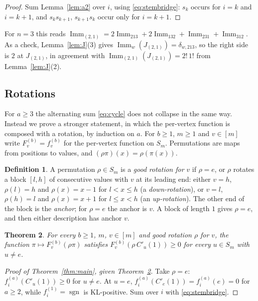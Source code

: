 \documentclass[11pt]{amsart}
\newtheorem{theorem}{Theorem}[section]
\theoremstyle{definition}
\newtheorem{definition}[theorem]{Definition}
\theoremstyle{remark}
\newcommand{\Imm}{\operatorname{Imm}}
\newcommand{\sgn}{\operatorname{sgn}}
\newcommand{\Cp}[1]{C'_{#1}(1)}
\begin{document}
\begin{proof}
Sum Lemma~\ref{lem:a2} over $i$, using \eqref{eq:stembridge}: $s_k$ occurs for $i=k$ and $i=k+1$, and $s_ks_{k+1}$, $s_{k+1}s_k$ occur only for $i=k+1$.
\end{proof}

For $n=3$ this reads $\Imm_{(2,1)}=2\Imm_{213}+2\Imm_{132}+\Imm_{231}+\Imm_{312}$. As a check, Lemma~\ref{lem:J}(3) gives $\Imm_w(J_{(2,1)})=\delta_{w,213}$, so the right side is $2$ at $J_{(2,1)}$, in agreement with $\Imm_{(2,1)}(J_{(2,1)})=2!\,1!$ from Lemma~\ref{lem:J}(2).

\subsection{Rotations}
For $a\ge3$ the alternating sum \eqref{eq:cycle} does not collapse in the same way. Instead we prove a stronger statement, in which the per-vertex function is composed with a rotation, by induction on $a$. For $b\ge1$, $m\ge1$ and $v\in[m]$ write $F^{(b)}_v=f^{(b)}_v$ for the per-vertex function on $S_m$. Permutations are maps from positions to values, and $(\rho\pi)(x)=\rho(\pi(x))$.

\begin{definition}\label{def:good}
A permutation $\rho\in S_m$ is a \emph{good rotation for $v$} if $\rho=e$, or $\rho$ rotates a block $[l,h]$ of consecutive values with $v$ at its leading end: either $v=h$, $\rho(l)=h$ and $\rho(x)=x-1$ for $l<x\le h$ (a \emph{down-rotation}), or $v=l$, $\rho(h)=l$ and $\rho(x)=x+1$ for $l\le x<h$ (an \emph{up-rotation}). The other end of the block is the \emph{anchor}; for $\rho=e$ the anchor is $v$. A block of length $1$ gives $\rho=e$, and then either description has anchor $v$.
\end{definition}

\begin{theorem}\label{thm:rotated}
For every $b\ge1$, $m$, $v\in[m]$ and good rotation $\rho$ for $v$, the function $\pi\mapsto F^{(b)}_v(\rho\pi)$ satisfies $F^{(b)}_v(\rho\,\Cp u)\ge0$ for every $u\in S_m$ with $u\ne e$.
\end{theorem}

\begin{proof}[Proof of Theorem~\ref{thm:main}, given Theorem~\ref{thm:rotated}]
Take $\rho=e$: $f^{(a)}_i(\Cp u)\ge0$ for $u\ne e$. At $u=e$, $f^{(a)}_i(\Cp e)=f^{(a)}_i(e)=0$ for $a\ge2$, while $f^{(1)}_i=\sgn$ is KL-positive. Sum over $i$ with \eqref{eq:stembridge}.
\end{proof}
\end{document}
